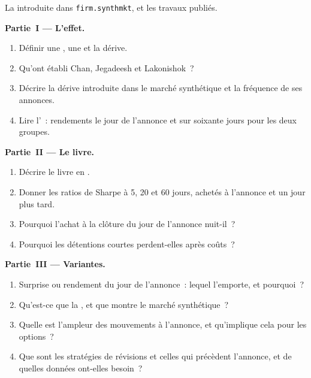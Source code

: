 \begin{problem}\label{pb:s1:earnings:1}
La  introduite dans \texttt{firm.synthmkt}, et les travaux publiés.

\medskip\noindent\textbf{Partie~I --- L'effet.}
\begin{enumerate}
\item Définir une , une  et la dérive.
\item Qu'ont établi Chan, Jegadeesh et Lakonishok~?
\item Décrire la dérive introduite dans le marché synthétique et la fréquence de ses annonces.
\item Lire l'~: rendements le jour de l'annonce et sur soixante jours pour les deux groupes.
\end{enumerate}

\medskip\noindent\textbf{Partie~II --- Le livre.}
\begin{enumerate}[resume]
\item Décrire le livre en .
\item Donner les ratios de Sharpe à 5, 20 et 60 jours, achetés à l'annonce et un jour plus tard.
\item Pourquoi l'achat à la clôture du jour de l'annonce nuit-il~?
\item Pourquoi les détentions courtes perdent-elles après coûts~?
\end{enumerate}

\medskip\noindent\textbf{Partie~III --- Variantes.}
\begin{enumerate}[resume]
\item Surprise ou rendement du jour de l'annonce~: lequel l'emporte, et pourquoi~?
\item Qu'est-ce que la , et que montre le marché synthétique~?
\item Quelle est l'ampleur des mouvements à l'annonce, et qu'implique cela pour les options~?
\item Que sont les stratégies de révisions et celles qui précèdent l'annonce, et de quelles données ont-elles besoin~?
\end{enumerate}


\end{problem}
